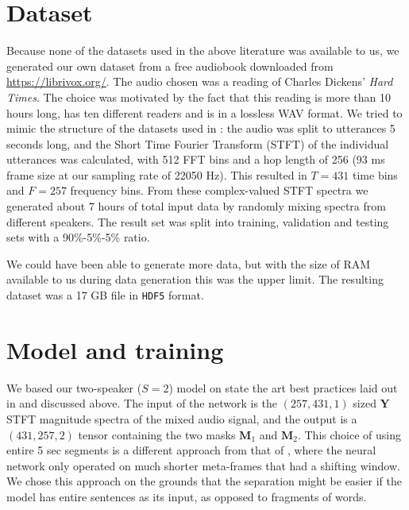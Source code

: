 \documentclass{article}
\newcommand{\mx}[1]{\mathbf{\bm{#1}}}
\begin{document}
\section{Dataset}
Because none of the datasets used in the above literature was available to us, we generated our own dataset from a free audiobook downloaded from \url{https://librivox.org/}. The audio chosen was a reading of Charles Dickens' \textit{Hard Times}. The choice was motivated by the fact that this reading is more than 10 hours long, has ten different readers and is in a lossless WAV format. We tried to mimic the structure of the datasets used in \cite{YuKTJ16}: the audio was split to utterances 5 seconds long, and the Short Time Fourier Transform (STFT) of the individual utterances was calculated, with 512 FFT bins and a hop length of 256 (93 ms frame size at our sampling rate of 22050 Hz). This resulted in $T=431$ time bins and $F=257$ frequency bins. From these complex-valued STFT spectra we generated about 7 hours of total input data by randomly mixing spectra from different speakers. The result set was split into training, validation and testing sets with a 90\%-5\%-5\% ratio.

We could have been able to generate more data, but with the size of RAM available to us during data generation this was the upper limit. The resulting dataset was a 17 GB file in \texttt{HDF5} format.

\section{Model and training}
We based our two-speaker ($S=2$) model on state the art best practices laid out in \cite{Wang18} and \cite{YuKTJ16} discussed above. The input of the network is the $(257,431,1)$ sized $\mx{Y}$ STFT magnitude spectra of the mixed audio signal, and the output is a $(431,257,2)$ tensor containing the two masks $\mx{M}_1$ and $\mx{M}_2$. This choice of using entire 5 sec segments is a different approach from that of \cite{YuKTJ16}, where the neural network only operated on much shorter meta-frames that had a shifting window. We chose this approach on the grounds that the separation might be easier if the model has entire sentences as its input, as opposed to fragments of words.
\end{document}
